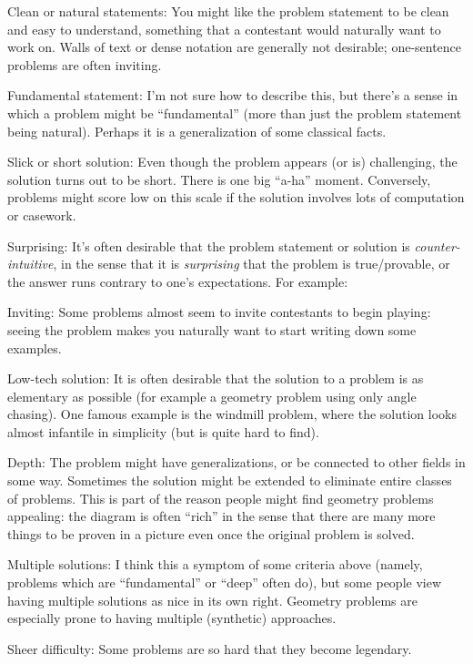 \documentclass[11pt]{scrartcl}
\theoremstyle{inlined}
\begin{document}
\begin{itemize}
\ii \alert{Clean or natural statements}:
You might like the problem statement to be clean and easy to understand,
something that a contestant would naturally want to work on.
Walls of text or dense notation are generally not desirable;
one-sentence problems are often inviting.

\ii \alert{Fundamental statement}:
I'm not sure how to describe this,
but there's a sense in which a problem might be ``fundamental''
(more than just the problem statement being natural).
Perhaps it is a generalization of some classical facts.

\ii \alert{Slick or short solution}:
Even though the problem appears (or is) challenging,
the solution turns out to be short.
There is one big ``a-ha'' moment.
Conversely, problems might score low on this scale
if the solution involves lots of computation or casework.

\ii \alert{Surprising}:
It's often desirable that the problem statement or solution
is \emph{counter-intuitive}, in the sense that it is
\emph{surprising} that the problem is true/provable,
or the answer runs contrary to one's expectations.
For example:

\ii \alert{Inviting}:
Some problems almost seem to invite contestants to begin playing:
seeing the problem makes you naturally want to start
writing down some examples.

\ii \alert{Low-tech solution}:
It is often desirable that the solution to a problem
is as elementary as possible (for example a geometry problem
using only angle chasing).
One famous example is the windmill problem,
where the solution looks almost infantile in simplicity
(but is quite hard to find).

\ii \alert{Depth}: The problem might have generalizations,
or be connected to other fields in some way.
Sometimes the solution might be extended to eliminate
entire classes of problems.
This is part of the reason people might find geometry problems appealing:
the diagram is often ``rich'' in the sense that there are many
more things to be proven in a picture even once the original problem is solved.

\ii \alert{Multiple solutions}:
I think this a symptom of some criteria above
(namely, problems which are ``fundamental'' or ``deep'' often do),
but some people view having multiple solutions as nice in its own right.
Geometry problems are especially prone to
having multiple (synthetic) approaches.

\ii \alert{Sheer difficulty}:
Some problems are so hard that they become legendary.
\end{itemize}
\end{document}
